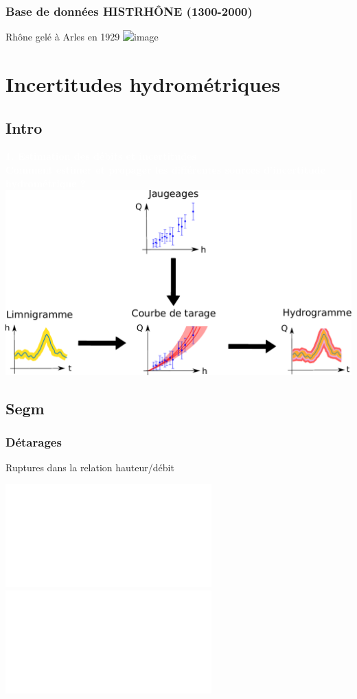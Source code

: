 \documentclass[compress,9pt]{beamer}
\begin{document}
	\begin{frame}%
		\frametitle{Base de données HISTRHÔNE (1300-2000)}
		\vfill		
		\centering
		Rhône gelé à Arles en 1929
		\vfill
		\includegraphics<1>[width = .8\textwidth]{./Figures/RhoneGele.jpg}
	\end{frame}	

\section{Incertitudes hydrométriques} 
	\subsection{Intro}
{
    \begin{frame}
        \begin{center}
        	\vfill
		 	\textcolor{white}{\large \textbf{1. Estimation des débits et incertitudes}}\\
		 	\vspace{0.5cm}
		 	\textcolor{white}{\large \textbf{Comment estimer et propager les différentes sources d'incertitude hydrométrique ?}}\\
			\vfill
			\includegraphics[width = .6\textwidth]{./Figures/Hydrom4.pdf}
        \end{center}
    \end{frame}
    }
    
  
    \subsection{Segm}
	\begin{frame}%
		\frametitle{Détarages}
		\centering
		Ruptures dans la relation hauteur/débit\\
		\vfill
		\begin{center}
			\includegraphics<1>[width = .45\textwidth]{./Figures/Detar1.pdf} 
			\includegraphics<2>[width = .45\textwidth]{./Figures/Detar2.pdf} 
		\end{center}
	\end{frame}
	
\end{document}
